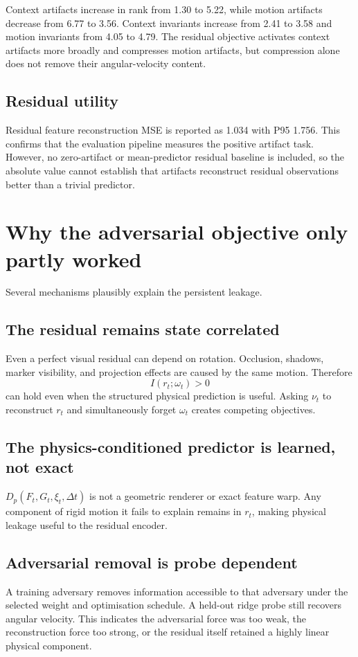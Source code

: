 \documentclass[11pt,a4paper]{article}
\begin{document}
Context artifacts increase in rank from 1.30 to 5.22, while motion artifacts decrease from 6.77 to 3.56. Context invariants increase from 2.41 to 3.58 and motion invariants from 4.05 to 4.79. The residual objective activates context artifacts more broadly and compresses motion artifacts, but compression alone does not remove their angular-velocity content.

\subsection{Residual utility}
Residual feature reconstruction MSE is reported as 1.034 with P95 1.756. This confirms that the evaluation pipeline measures the positive artifact task. However, no zero-artifact or mean-predictor residual baseline is included, so the absolute value cannot establish that artifacts reconstruct residual observations better than a trivial predictor.

\section{Why the adversarial objective only partly worked}
Several mechanisms plausibly explain the persistent leakage.

\subsection{The residual remains state correlated}
Even a perfect visual residual can depend on rotation. Occlusion, shadows, marker visibility, and projection effects are caused by the same motion. Therefore
\begin{equation}
I(r_t;\omega_t)>0
\end{equation}
can hold even when the structured physical prediction is useful. Asking $\nu_t$ to reconstruct $r_t$ and simultaneously forget $\omega_t$ creates competing objectives.

\subsection{The physics-conditioned predictor is learned, not exact}
$D_p(F_t,G_t,\xi_t,\Delta t)$ is not a geometric renderer or exact feature warp. Any component of rigid motion it fails to explain remains in $r_t$, making physical leakage useful to the residual encoder.

\subsection{Adversarial removal is probe dependent}
A training adversary removes information accessible to that adversary under the selected weight and optimisation schedule. A held-out ridge probe still recovers angular velocity. This indicates the adversarial force was too weak, the reconstruction force too strong, or the residual itself retained a highly linear physical component.
\end{document}
